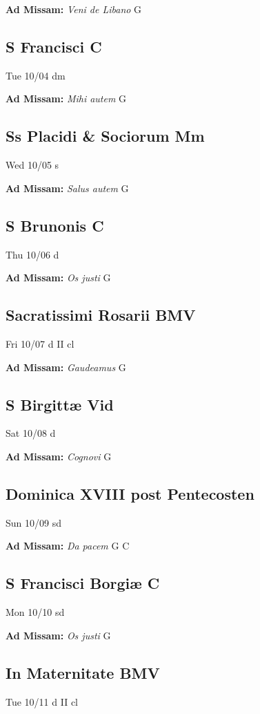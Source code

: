 \documentclass[letterpaper, 10pt, twocolumn]{article}
\begin{document}
\textbf{Ad Missam:} \textit{Veni de Libano} G 

\subsection*{S Francisci C}Tue 10/04 dm

\textbf{Ad Missam:} \textit{Mihi autem} G 

\subsection*{Ss Placidi \& Sociorum Mm}Wed 10/05 s

\textbf{Ad Missam:} \textit{Salus autem} G 

\subsection*{S Brunonis C}Thu 10/06 d

\textbf{Ad Missam:} \textit{Os justi} G 

\subsection*{Sacratissimi Rosarii BMV}Fri 10/07 d II cl

\textbf{Ad Missam:} \textit{Gaudeamus} G 

\subsection*{S Birgittæ Vid}Sat 10/08 d

\textbf{Ad Missam:} \textit{Cognovi} G 

\subsection*{Dominica XVIII post Pentecosten}Sun 10/09 sd

\textbf{Ad Missam:} \textit{Da pacem} G C 

\subsection*{S Francisci Borgiæ C}Mon 10/10 sd

\textbf{Ad Missam:} \textit{Os justi} G 

\subsection*{In Maternitate BMV}Tue 10/11 d II cl
\end{document}
